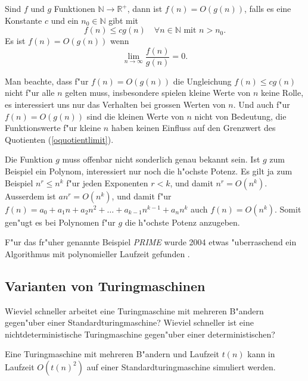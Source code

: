 \begin{definition}
Sind $f$ und $g$ Funktionen $\mathbb N\to\mathbb R^+$, dann ist
$f(n)=O(g(n))$, falls es eine Konstante $c$ und ein $n_0\in\mathbb N$
gibt mit
\[
f(n)\le cg(n)\quad \forall n\in\mathbb N\text{ mit } n > n_0.
\]
Es ist $f(n)=O(g(n))$ wenn 
\begin{equation}
\lim_{n\to\infty}\frac{f(n)}{g(n)}=0.
\label{oquotientlimit}
\end{equation}
\end{definition}
Man beachte, dass f"ur $f(n)=O(g(n))$ die Ungleichung $f(n)\le
cg(n)$ nicht f"ur alle $n$ gelten muss, insbesondere spielen kleine
Werte von $n$ keine Rolle, es interessiert uns nur das Verhalten
bei grossen Werten von $n$.
Und auch f"ur $f(n)=O(g(n))$ sind die kleinen Werte von $n$ nicht
von Bedeutung, die Funktionswerte f"ur kleine $n$ haben keinen
Einfluss auf den Grenzwert des Quotienten (\ref{oquotientlimit}).

Die Funktion $g$ muss offenbar nicht sonderlich genau bekannt
sein. Ist $g$ zum Beispiel ein Polynom, interessiert nur noch
die h"ochste Potenz. Es gilt ja zum Beispiel
$ n^r\le n^k $ f"ur jeden Exponenten $r<k$, und damit
$n^r=O(n^k)$. Ausserdem ist $an^r=O(n^k)$, und damit
f"ur $f(n)=a_0+a_1n+a_2n^2+\dots+a_{k-1}n^{k-1}+a_nn^k$ auch
$ f(n)=O(n^k) $. Somit gen"ugt es bei Polynomen f"ur $g$ die
h"ochste Potenz anzugeben.

\begin{beispiel}
F"ur das fr"uher genannte Beispiel \textsl{PRIME} wurde 2004 etwas
"uberraschend ein Algorithmus mit
polynomieller Laufzeit gefunden \cite{skript:aks}.
\end{beispiel}

\subsection{Varianten von Turingmaschinen}
Wieviel schneller arbeitet eine Turingmaschine mit mehreren B"andern 
gegen"uber einer Standardturingmaschine? Wieviel schneller ist eine
nichtdeterministische Turingmaschine gegen"uber einer deterministischen?

\begin{satz}
Eine Turingmaschine mit mehreren B"andern und Laufzeit $t(n)$ kann
in Laufzeit $O(t(n)^2)$ auf einer Standardturingmaschine
simuliert werden.
\end{satz}

